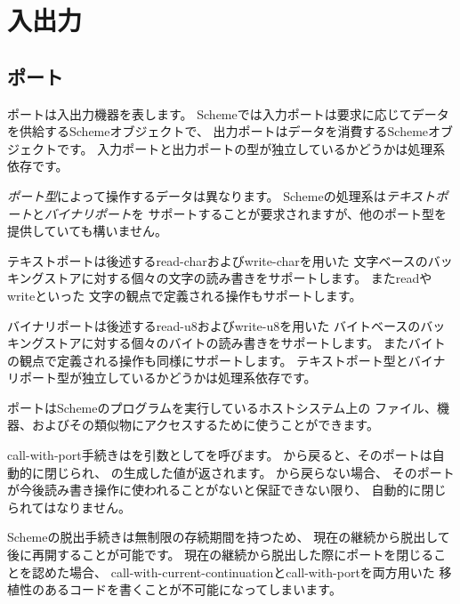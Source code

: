 \section{入出力}

\subsection{ポート}
\label{portsection}

ポートは入出力機器を表します。
Schemeでは入力ポートは要求に応じてデータを供給するSchemeオブジェクトで、
出力ポートはデータを消費するSchemeオブジェクトです。
入力ポートと出力ポートの型が独立しているかどうかは処理系依存です。

{\em ポート型}によって操作するデータは異なります。
Schemeの処理系は{\em テキストポート}と{\em バイナリポート}を
サポートすることが要求されますが、他のポート型を提供していても構いません。

テキストポートは後述する{\cf read-char}および{\cf write-char}を用いた
文字ベースのバッキングストアに対する個々の文字の読み書きをサポートします。
また{\cf read}や{\cf write}といった
文字の観点で定義される操作もサポートします。

バイナリポートは後述する{\cf read-u8}および{\cf write-u8}を用いた
バイトベースのバッキングストアに対する個々のバイトの読み書きをサポートします。
またバイトの観点で定義される操作も同様にサポートします。
テキストポート型とバイナリポート型が独立しているかどうかは処理系依存です。

ポートはSchemeのプログラムを実行しているホストシステム上の
ファイル、機器、およびその類似物にアクセスするために使うことができます。

\begin{entry}{%
}

{\cf call-with-port}手続きはを引数としてを呼びます。
から戻ると、そのポートは自動的に閉じられ、
の生成した値が返されます。
から戻らない場合、
そのポートが今後読み書き操作に使われることがないと保証できない限り、
自動的に閉じられてはなりません。

\begin{rationale}
Schemeの脱出手続きは無制限の存続期間を持つため、
現在の継続から脱出して後に再開することが可能です。
現在の継続から脱出した際にポートを閉じることを認めた場合、
{\cf call-\+with-\+current-\+continuation}と{\cf call-\+with-\+port}を両方用いた
移植性のあるコードを書くことが不可能になってしまいます。
\end{rationale} 

\end{entry}

